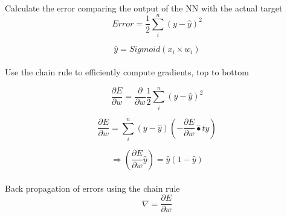 \documentclass{llncs}       %
\begin{document}
\paragraph{}
\paragraph{}Calculate the error comparing the output of the NN with the actual target 
\begin{equation} 
Error = \frac{1}{2}\sum_i^n( y -\widehat{y})^2
\end{equation}

\begin{equation} 
\widehat{y}=Sigmoid(x_{i}\times w_{i})
\end{equation}

\paragraph{}
\paragraph{} Use the chain rule to efficiently compute gradients, top to bottom

\begin{equation} 
\frac{\partial E}{\partial w}=\frac{\partial }{\partial w} \frac{1}{2}\sum_i^n( y -\widehat{y})^2
\end{equation}

\begin{equation} 
\frac{\partial E}{\partial w} = \sum_i^n ( y -\widehat{y})  (-\frac{\partial E}{\partial w}\widehat{•}t{y})
\end{equation}

\begin{equation} 
\Rightarrow(\frac{\partial E}{\partial w}\widehat{y})= \widehat{y}(1-\widehat{y})
\end{equation}

\paragraph{}
\paragraph{}Back propagation of errors using the chain rule
\begin{equation} 
\nabla=\frac{\partial E}{\partial w}
\end{equation}
\end{document}
